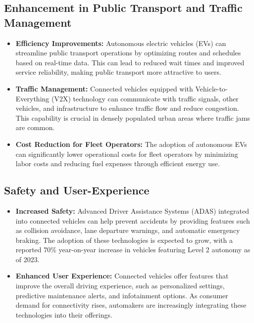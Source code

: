 \documentclass[a4paper,12pt]{report}
\begin{document}
\subsection{Enhancement in Public Transport and Traffic Management}
\begin{itemize}
    \item \textbf{Efficiency Improvements: }
    Autonomous electric vehicles (EVs) can streamline public transport operations by optimizing routes and schedules based on real-time data. This can lead to reduced wait times and improved service reliability, making public transport more attractive to users.
    \item \textbf{Traffic Management: }
    Connected vehicles equipped with Vehicle-to-Everything (V2X) technology can communicate with traffic signals, other vehicles, and infrastructure to enhance traffic flow and reduce congestion. This capability is crucial in densely populated urban areas where traffic jams are common.
    \item \textbf{Cost Reduction for Fleet Operators: }
    The adoption of autonomous EVs can significantly lower operational costs for fleet operators by minimizing labor costs and reducing fuel expenses through efficient energy use.
\end{itemize}

\subsection{Safety and User-Experience }
\begin{itemize}
    \item \textbf{Increased Safety: }
    Advanced Driver Assistance Systems (ADAS) integrated into connected vehicles can help prevent accidents by providing features such as collision avoidance, lane departure warnings, and automatic emergency braking. The adoption of these technologies is expected to grow, with a reported 70\% year-on-year increase in vehicles featuring Level 2 autonomy as of 2023.
    \item \textbf{Enhanced User Experience: }
    Connected vehicles offer features that improve the overall driving experience, such as personalized settings, predictive maintenance alerts, and infotainment options. As consumer demand for connectivity rises, automakers are increasingly integrating these technologies into their offerings.
\end{itemize}
\end{document}
